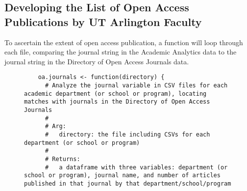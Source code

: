 \documentclass{article}
\begin{document}
\subsection{Developing the List of Open Access Publications by UT Arlington Faculty}
To ascertain the extent of open access publication, a function will loop through each file, comparing the journal string in the Academic Analytics data to the journal string in the Directory of Open Access Journals data.
\begin{figure}[htpb]
	\centering
	\begin{lstlisting}
	oa.journals <- function(directory) {
	  # Analyze the journal variable in CSV files for each academic department (or school or program), locating matches with journals in the Directory of Open Access Journals
	  #
	  # Arg:
	  #   directory: the file including CSVs for each department (or school or program)
	  #  
	  # Returns:
	  #   a dataframe with three variables: department (or school or program), journal name, and number of articles published in that journal by that department/school/program
	  

\end{lstlisting}
\end{figure}
\end{document}
